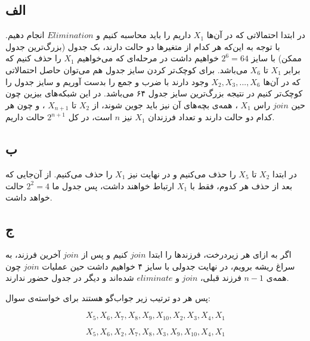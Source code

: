 \subsection*{الف}

در ابتدا احتمالاتی که در آن‌ها
$X_1$
داریم را باید محاسبه کنیم و
$Elimination$
انجام دهیم.
با توجه به این‌که هر کدام از متغیرها دو حالت دارند، بک جدول (بزرگ‌ترین جدول ممکن) با سایز 
$2^6 = 64$
خواهیم داشت در مرحله‌ای که می‌خواهیم 
$X_1$
را حذف کنیم که برابر
$X_1$
تا
$X_6$
می‌باشد. برای کوچک‌تر کردن سایز جدول هم می‌توان حاصل احتمالاتی که در آن‌ها
$X_2 , X_3 , ... , X_6$
وجود دارند با ضرب و جمع را بدست آوریم و سایز جدول را کوچک‌تر کنیم در نتیجه بزرگ‌ترین سایز جدول ۶۴ می‌باشد. 
در این شبکه‌های بیزین چون حین
$join$
راس
$X_1$
، همه‌ی بچه‌های آن نیز باید جوین شوند، از
$X_2$ 
تا
$X_{n+1}$
، و چون هر کدام دو حالت دارند و تعداد فرزندان 
$X_1$
نیز 
$n$
است، در کل
$2^{n+1}$
حالت داریم.

\subsection*{ب}

در ابتدا 
$X_2$
تا
$X_5$
را حذف می‌کنیم و در نهایت نیز 
$X_1$
را حذف می‌کنیم. از آن‌جایی که بعد از حذف هر کدوم، فقط با 
$X_1$
ارتباط خواهند داشت، پس جدول ما
$2^2 = 4$
حالت خواهد داشت.
\subsection*{ج}

اگر به ازای هر زیردرخت، فرزندها را ابتدا
$join$
کنیم و پس از 
$join$
آخرین فرزند، به سراغ ریشه برویم، در نهایت جدولی با سایز ۴ خواهیم داشت حین عملیات
$join$
چون همه‌ی 
$n-1$
فرزند قبلی، 
$join$
و
$eliminate$
شده‌اند و دیگر در جدول حضور ندارند.

پس هر دو ترتیب زیر جواب‌گو هستند برای خواسته‌ی سوال:

$$
X_5 , X_6 , X_7 , X_8 , X_9 , X_{10} , X_2 , X_3 , X_4 , X_1
$$

$$
X_5 , X_6 , X_2 , X_7 , X_8 , X_3 , X_9 , X_{10} , X_4 , X_1
$$
